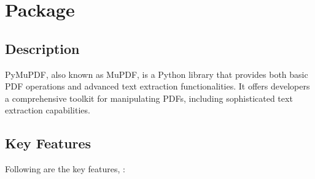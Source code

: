%
%
%
%

\chapter{Package }

\section{Description}

PyMuPDF, also known as MuPDF, is a Python library that provides both basic PDF operations and advanced text extraction functionalities. It offers developers a comprehensive toolkit for manipulating PDFs, including sophisticated text extraction capabilities.

\section{Key Features}

Following are the key features\cite{pymupd:2024a}, \cite{pymupd:2024b}: %


